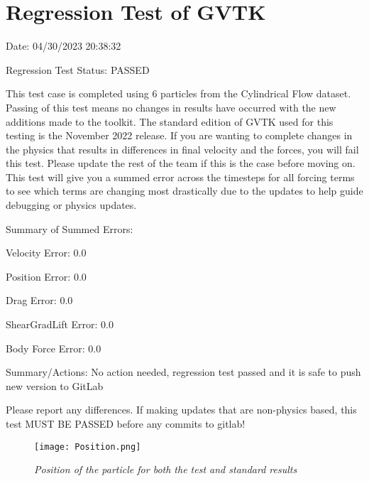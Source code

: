 \documentclass{article}
\begin{document}
\section{Regression Test of GVTK}
Date: 04/30/2023 20:38:32

\vspace{5pt}

\noindent Regression Test Status: PASSED

\vspace{5pt}

\noindent This test case is completed using 6 particles from the Cylindrical Flow dataset. Passing of this test means no changes in results have occurred with the new additions made to the toolkit.
The standard edition of GVTK used for this testing is the November 2022 release. If you are wanting to complete changes in the physics that results in differences in final velocity and the forces,
you will fail this test. Please update the rest of the team if this is the case before moving on. This test will give you a summed error across the timesteps for all forcing terms to see which terms
are changing most drastically due to the updates to help guide debugging or physics updates.



\vspace{5pt}

\noindent Summary of Summed Errors:
\vspace{5pt}

Velocity Error: 0.0

Position Error: 0.0

Drag Error: 0.0

ShearGradLift Error: 0.0

Body Force Error: 0.0

\vspace{5pt}

\noindent Summary/Actions: No action needed, regression test passed and it is safe to push new version to GitLab

\vspace{5pt}

\noindent Please report any differences. If making updates that are non-physics based, this test MUST BE PASSED before any commits to gitlab!

\begin{figure}[htbp]
\centering
\texttt{[image: Position.png]}
\caption{\textit{Position of the particle for both the test and standard results}}
\label{fig:postion}
\end{figure}
\end{document}
